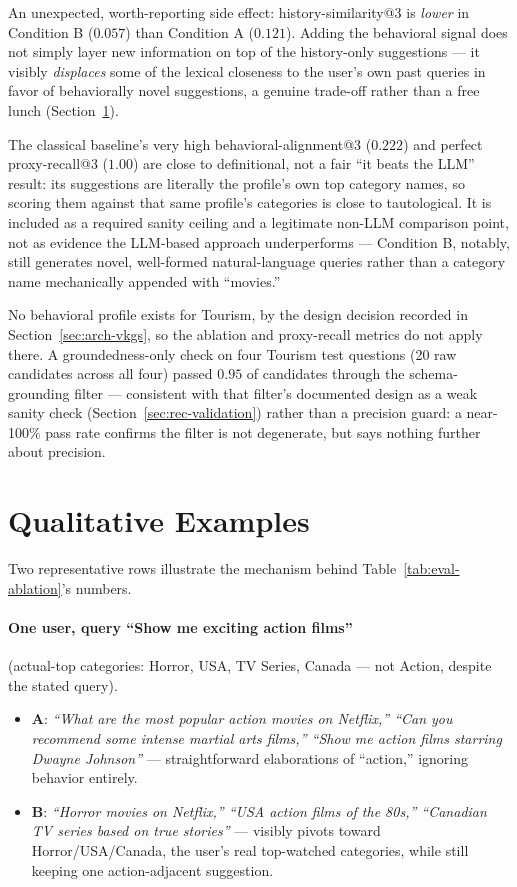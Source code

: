 \documentclass[11pt,a4paper,oneside]{book}
\begin{document}
An unexpected, worth-reporting side effect: history-similarity@3 is \emph{lower} in Condition B
($0.057$) than Condition A ($0.121$). Adding the behavioral signal does not simply layer new
information on top of the history-only suggestions --- it visibly \emph{displaces} some of the
lexical closeness to the user's own past queries in favor of behaviorally novel suggestions, a
genuine trade-off rather than a free lunch (Section~\ref{sec:eval-qual}).

The classical baseline's very high behavioral-alignment@3 ($0.222$) and perfect proxy-recall@3
($1.00$) are close to definitional, not a fair ``it beats the LLM'' result: its suggestions are
literally the profile's own top category names, so scoring them against that same profile's
categories is close to tautological. It is included as a required sanity ceiling and a legitimate
non-LLM comparison point, not as evidence the LLM-based approach underperforms --- Condition B,
notably, still generates novel, well-formed natural-language queries rather than a category name
mechanically appended with ``movies.''

No behavioral profile exists for Tourism, by the design decision recorded in
Section~\ref{sec:arch-vkgs}, so the ablation and proxy-recall metrics do not apply there. A
groundedness-only check on four Tourism test questions (20 raw candidates across all four) passed
$0.95$ of candidates through the schema-grounding filter --- consistent with that filter's
documented design as a weak sanity check (Section~\ref{sec:rec-validation}) rather than a precision
guard: a near-100\% pass rate confirms the filter is not degenerate, but says nothing further about
precision.

\section{Qualitative Examples}
\label{sec:eval-qual}

Two representative rows illustrate the mechanism behind Table~\ref{tab:eval-ablation}'s numbers.

\paragraph{One user, query ``Show me exciting action films''} (actual-top categories: Horror, USA,
TV Series, Canada --- not Action, despite the stated query).
\begin{itemize}
    \item \textbf{A}: \emph{``What are the most popular action movies on Netflix,'' ``Can you
        recommend some intense martial arts films,'' ``Show me action films starring Dwayne
        Johnson''} --- straightforward elaborations of ``action,'' ignoring behavior entirely.
    \item \textbf{B}: \emph{``Horror movies on Netflix,'' ``USA action films of the 80s,''
        ``Canadian TV series based on true stories''} --- visibly pivots toward Horror/USA/Canada,
        the user's real top-watched categories, while still keeping one action-adjacent suggestion.
\end{itemize}
\end{document}
